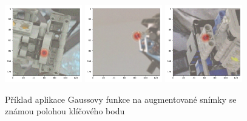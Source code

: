 \begin{figure}[H]
\centering
\includegraphics[width=0.3\textwidth,keepaspectratio]{Figures/kp_examples/kp_example_00.png}
\includegraphics[width=0.3\textwidth,keepaspectratio]{Figures/kp_examples/kp_example_01.png}
\includegraphics[width=0.3\textwidth,keepaspectratio]{Figures/kp_examples/kp_example_02.png}
\caption[Příklad aplikace Gaussovy funkce na  snímky s klíčovým bodem]{Příklad aplikace Gaussovy funkce na augmentované snímky se známou polohou klíčového bodu}
\label{fig:kp_examples}
\end{figure}

\endinput